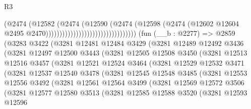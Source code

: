 \begin{lexlean}{R3}
\begin{coremodule}
                                                      (@2474
                                                        (@12582
                                                          (@2474
                                                            (@12590
                                                              (@2474
                                                                (@12598
                                                                  (@2474
                                                                    (@12602
                                                                      @12604
                                                                      @2495
                                                                      @2470)))))))))))))))))))))))))))))))))
    (fun (__b : @2277) =>
    @2859
      (@3283
        @3422
        (@3281
          @12481
          @12484
          @3429
          (@3281
            @12489
            @12492
            @3436
            (@3281
              @12497
              @12500
              @3443
              (@3281
                @12505
                @12508
                @3450
                (@3281
                  @12513
                  @12516
                  @3457
                  (@3281
                    @12521
                    @12524
                    @3464
                    (@3281
                      @12529
                      @12532
                      @3471
                      (@3281
                        @12537
                        @12540
                        @3478
                        (@3281
                          @12545
                          @12548
                          @3485
                          (@3281
                            @12553
                            @12556
                            @3492
                            (@3281
                              @12561
                              @12564
                              @3499
                              (@3281
                                @12569
                                @12572
                                @3506
                                (@3281
                                  @12577
                                  @12580
                                  @3513
                                  (@3281
                                    @12585
                                    @12588
                                    @3520
                                    (@3281
                                      @12593
                                      @12596

\end{coremodule}
\end{lexlean}
